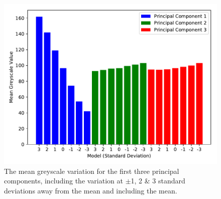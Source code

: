 \begin{figure}[h]
  \centering
  \includegraphics[width=.9\textwidth]{Chapters/Chapter_PCA_images/pca_gs.pdf}
  \caption{The mean greyscale variation for the first three principal
	components, including the variation at $\pm$1, 2 \& 3 standard
	deviations away from the mean and including the mean.}
  \label{fig:pca_gs}
\end{figure}

